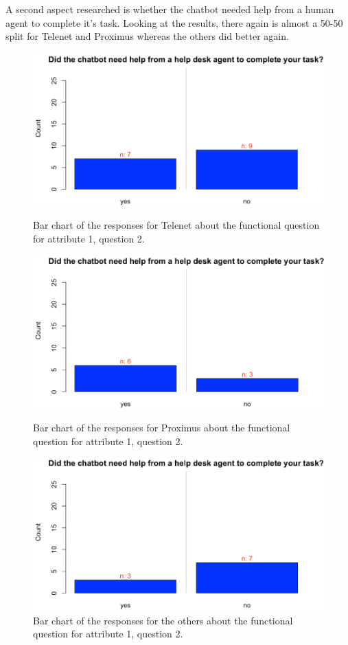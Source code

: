 \break
A second aspect researched is whether the chatbot needed help from a human agent to complete it's task. Looking at the results, there again is almost a 50-50 split for Telenet and Proximus whereas the others did better again.\\
\begin{figure}[!htb]
	\includegraphics[width=\linewidth]{../LaTeX/Figures/Comparative/Q1Tb.png}
	\caption{Bar chart of the responses for Telenet about the functional question for attribute 1, question 2.}\label{fig:Q1Tb}
	\endminipage\hfill
	\includegraphics[width=\linewidth]{../LaTeX/Figures/Comparative/Q1Pb.png}
	\caption{Bar chart of the responses for Proximus about the functional question for attribute 1, question 2.}\label{fig:Q1Pb}
	\endminipage\hfill
	\includegraphics[width=\linewidth]{../LaTeX/Figures/Comparative/Q1Ob.png}
	\caption{Bar chart of the responses for the others about the functional question for attribute 1, question 2.}\label{fig:Q1Ob}
	\endminipage\hfill
\end{figure}
